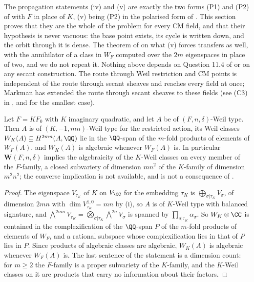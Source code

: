 \begin{remark}\label{rem:cmwhatisnew}
The propagation statements (iv) and (v) are exactly the two forms (P1) and
(P2) of \cite[Remark~3.7]{paperII} with $F$ in place of $K$, (v) being (P2) in the
polarised form of \cite[Remark~3.6]{paperII}. This section proves that they are the
whole of the problem for every CM field, and that their hypothesis is never
vacuous: the base point exists, its cycle is written down, and the orbit
through it is dense. The theorem of \cite[Theorem~2.5]{paperII} on what (v) forces
transfers as well, with the annihilator of a class in $W_{F}$ computed over
the $2m$ eigenspaces in place of two, and we do not repeat it. Nothing above
depends on Question 11.4 of \cite{Mar25b} or on any secant construction. The
route through Weil restriction and CM points is independent of the route
through secant sheaves and reaches every field at once; Markman has extended
the route through secant sheaves to these fields \cite{Mar25c} (see (C3) in
\cite[Section~2.5]{paperIII}, and \cite[Section~5.2]{paperII} for the smallest case).
\end{remark}

\begin{proposition}\label{prop:composite}
Let $F=KF_{0}$ with $K$ imaginary quadratic, and let $A$ be of
$(F,n,\delta)$-Weil type. Then $A$ is of $(K,-1,mn)$-Weil type for the
restricted action, its Weil classes $W_{K}(A)\subseteq H^{2mn}(A,\QQ)$ lie in
the $\QQ$-span of the $m$-fold products of elements of $W_{F}(A)$, and
$W_{K}(A)$ is algebraic whenever $W_{F}(A)$ is. In particular
$\mathbf{W}(F,n,\delta)$ implies the algebraicity of the $K$-Weil classes on
every member of the $F$-family, a closed subvariety of dimension $mn^{2}$ of
the $K$-family of dimension $m^{2}n^{2}$; the converse implication is not
available, and  is not a consequence of
.
\end{proposition}

\begin{proof}
The eigenspace $V_{\tau_{K}}$ of $K$ on $V_{\CC}$ for the embedding
$\tau_{K}$ is $\bigoplus_{\sigma|\tau_{K}}V_{\sigma}$, of dimension $2mn$
with $\dim V_{\tau_{K}}^{1,0}=mn$ by (i), so $A$ is of
$K$-Weil type with balanced signature, and
$\bigwedge^{2mn}V_{\tau_{K}}=\bigotimes_{\sigma|\tau_{K}}\bigwedge^{2n}V_{\sigma}$
is spanned by $\prod_{\sigma|\tau_{K}}\alpha_{\sigma}$. So
$W_{K}\otimes\CC$ is contained in the complexification of the $\QQ$-span $P$ of
the $m$-fold products of elements of $W_{F}$, and a rational subspace whose
complexification lies in that of $P$ lies in $P$. Since products of
algebraic classes are algebraic, $W_{K}(A)$ is algebraic whenever $W_{F}(A)$
is. The last sentence of the statement is a dimension count:
for $m\ge2$ the $F$-family is a proper subvariety of the $K$-family, and the
$K$-Weil classes on it are products that carry no information about their
factors.
\end{proof}

